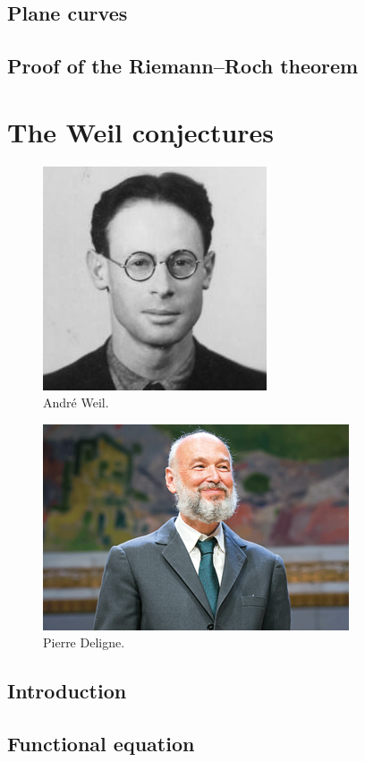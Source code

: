 \documentclass[11pt, oneside,margin=1in]{article}
\begin{document}
\subsection{Plane curves}
\subsection{Proof of the Riemann--Roch theorem}
\section{The Weil conjectures}
\begin{figure}
\begin{center}
\includegraphics[scale=0.8]{images/weil}
\caption{Andr\'e Weil.}
\end{center}
\end{figure}
\begin{figure}
\begin{center}
\includegraphics[scale=0.8]{images/deligne}
\caption{Pierre Deligne.}
\end{center}
\end{figure}
\subsection{Introduction}
\subsection{Functional equation}
\end{document}

